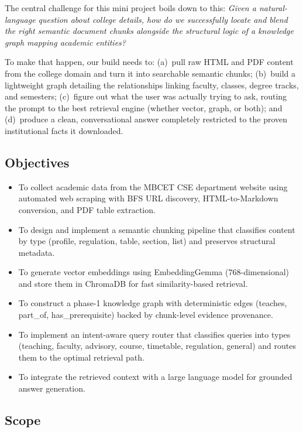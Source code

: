 \documentclass[12pt,a4paper]{report}
\begin{document}
\par
The central challenge for this mini project boils down to this: \textit{Given a natural-language question about college details, how do we successfully locate and blend the right semantic document chunks alongside the structural logic of a knowledge graph mapping academic entities?}

\par
To make that happen, our build needs to: (a)~pull raw HTML and PDF content from the college domain and turn it into searchable semantic chunks; (b)~build a lightweight graph detailing the relationships linking faculty, classes, degree tracks, and semesters; (c)~figure out what the user was actually trying to ask, routing the prompt to the best retrieval engine (whether vector, graph, or both); and (d)~produce a clean, conversational answer completely restricted to the proven institutional facts it downloaded.

\subsection*{Objectives}

\begin{itemize}
  \item To collect academic data from the MBCET CSE department website using automated web scraping with BFS URL discovery, HTML-to-Markdown conversion, and PDF table extraction.
  \item To design and implement a semantic chunking pipeline that classifies content by type (profile, regulation, table, section, list) and preserves structural metadata.
  \item To generate vector embeddings using EmbeddingGemma (768-dimensional) and store them in ChromaDB for fast similarity-based retrieval.
  \item To construct a phase-1 knowledge graph with deterministic edges (teaches, part\_of, has\_prerequisite) backed by chunk-level evidence provenance.
  \item To implement an intent-aware query router that classifies queries into types (teaching, faculty, advisory, course, timetable, regulation, general) and routes them to the optimal retrieval path.
  \item To integrate the retrieved context with a large language model for grounded answer generation.
\end{itemize}

\subsection*{Scope}
\end{document}
